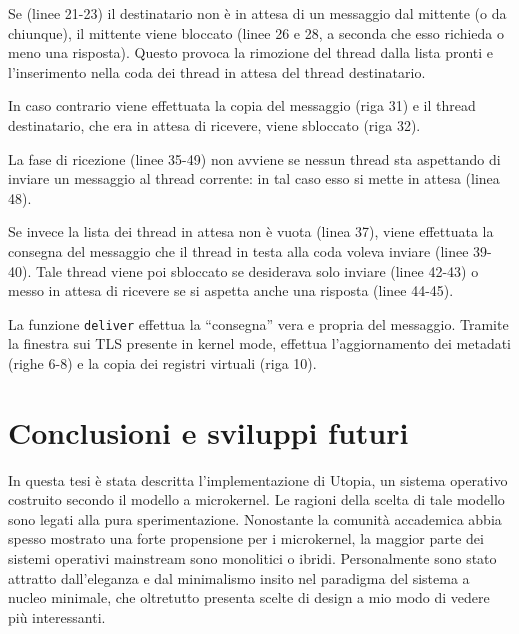 \documentclass[12pt,a4paper]{report}
\newcommand{\vir}[1]{``#1''}
\begin{document}
			Se (linee 21-23) il destinatario non è in attesa di un messaggio dal mittente (o da chiunque), il mittente
			viene bloccato (linee 26 e 28, a seconda che esso richieda o meno una risposta). Questo provoca la
			rimozione del thread dalla lista pronti e l'inserimento nella coda dei thread in attesa del thread destinatario.
			
			In caso contrario viene effettuata la copia del messaggio (riga 31) e il thread destinatario, che era in attesa
			di ricevere, viene sbloccato (riga 32).
			
			La fase di ricezione (linee 35-49) non avviene se nessun thread sta aspettando di inviare un messaggio al
			thread corrente: in tal caso esso si mette in attesa (linea 48).
			
			Se invece la lista dei thread in attesa non è vuota (linea 37), viene effettuata la consegna del messaggio
			che il thread in testa alla coda voleva inviare (linee 39-40). Tale thread viene poi sbloccato se desiderava
			solo inviare (linee 42-43) o messo in attesa di ricevere se si aspetta anche una risposta (linee 44-45).
			
			La funzione \texttt{deliver} effettua la \vir{consegna} vera e propria del messaggio. Tramite la finestra sui TLS
			presente in kernel mode, effettua l'aggiornamento dei metadati (righe 6-8) e la copia dei registri
			virtuali (riga 10).
					
\chapter{Conclusioni e sviluppi futuri}
	In questa tesi è stata descritta l'implementazione di Utopia, un sistema operativo costruito secondo il modello
	a microkernel. Le ragioni della scelta di tale modello sono legati alla pura sperimentazione.
	Nonostante la comunità accademica abbia spesso mostrato una forte propensione per i microkernel, la maggior parte dei
	sistemi operativi mainstream sono monolitici o ibridi.
	Personalmente sono stato attratto dall'eleganza e dal minimalismo insito nel paradigma del sistema a nucleo minimale,
	che oltretutto presenta scelte di design a mio modo di vedere più interessanti.
	
\end{document}
